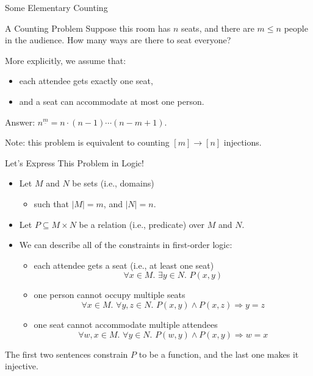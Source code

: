 \documentclass{beamer}
\begin{document}
\begin{frame}{Some Elementary Counting}
  \begin{exampleblock}{A Counting Problem}
    Suppose this room has \alert{$n$} seats, and there are \alert{$m \le n$}
    people in the audience. How many ways are there to seat everyone?
  \end{exampleblock}

  \pause
  More explicitly, we assume that:
  \begin{itemize}
  \item each attendee gets exactly one seat,
  \item and a seat can accommodate at most one person.
  \end{itemize}

  \pause
  \alert{Answer:} $n^{\underline{m}} = n \cdot (n-1)\cdots(n-m+1)$.

  Note: this problem is equivalent to counting \alert{$[m] \to [n]$} injections.

\end{frame}

\begin{frame}{Let's Express This Problem in Logic!}
  \begin{itemize}
    \item Let \alert{$M$} and \alert{$N$} be sets (i.e., domains)
    \begin{itemize}
      \item such that \alert{$|M| = m$}, and \alert{$|N| = n$}.
    \end{itemize}
    \item Let \alert{$P \subseteq M \times N$} be a relation (i.e., predicate)
          over \alert{$M$} and \alert{$N$}.
    \item We can describe all of the constraints in first-order logic:
    \begin{itemize}
      \item \pause each attendee gets a seat (i.e., at least one seat)
      \[
        \forall x \in M\text{. }\exists y \in N\text{. }P(x, y)
      \]
      \item \pause one person cannot occupy multiple seats
      \[
        \forall x \in M\text{. }\forall y, z \in N\text{. }P(x, y) \land P(x, z) \Rightarrow y=z
      \]
      \item \pause one seat cannot accommodate multiple attendees
      \[
        \forall w, x \in M\text{. }\forall y \in N\text{. }P(w, y) \land P(x, y) \Rightarrow w=x
      \]
    \end{itemize}
  \end{itemize}
  \pause The first two sentences constrain \alert{$P$} to be a function, and the
  last one makes it injective.
\end{frame}
\end{document}
